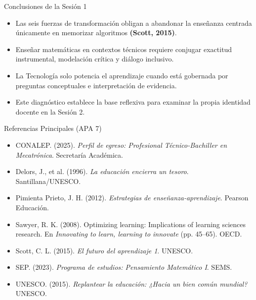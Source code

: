 \documentclass[aspectratio=169,spanish,xcolor=table]{beamer}
\begin{document}
\begin{frame}{Conclusiones de la Sesión 1}
  \begin{itemize}\normalsize
    \item Las seis fuerzas de transformación obligan a abandonar la enseñanza centrada únicamente en memorizar algoritmos \textbf{(Scott, 2015)}.
    \item Enseñar matemáticas en contextos técnicos requiere conjugar exactitud instrumental, modelación crítica y diálogo inclusivo.
    \item La Tecnología solo potencia el aprendizaje cuando está gobernada por preguntas conceptuales e interpretación de evidencia.
    \item Este diagnóstico establece la base reflexiva para examinar la propia identidad docente en la Sesión 2.
  \end{itemize}
\end{frame}

\begin{frame}{Referencias Principales (APA 7)}
  \scriptsize\setlength{\parskip}{6pt}
  \begin{itemize}
    \item CONALEP. (2025). \textit{Perfil de egreso: Profesional Técnico-Bachiller en Mecatrónica}. Secretaría Académica.
    \item Delors, J., et al. (1996). \textit{La educación encierra un tesoro}. Santillana/UNESCO.
    \item Pimienta Prieto, J. H. (2012). \textit{Estrategias de enseñanza-aprendizaje}. Pearson Educación.
    \item Sawyer, R. K. (2008). Optimizing learning: Implications of learning sciences research. En \textit{Innovating to learn, learning to innovate} (pp. 45--65). OECD.
    \item Scott, C. L. (2015). \textit{El futuro del aprendizaje 1}. UNESCO.
    \item SEP. (2023). \textit{Programa de estudios: Pensamiento Matemático I}. SEMS.
    \item UNESCO. (2015). \textit{Replantear la educación: ¿Hacia un bien común mundial?} UNESCO.
  \end{itemize}
\end{frame}
\end{document}
